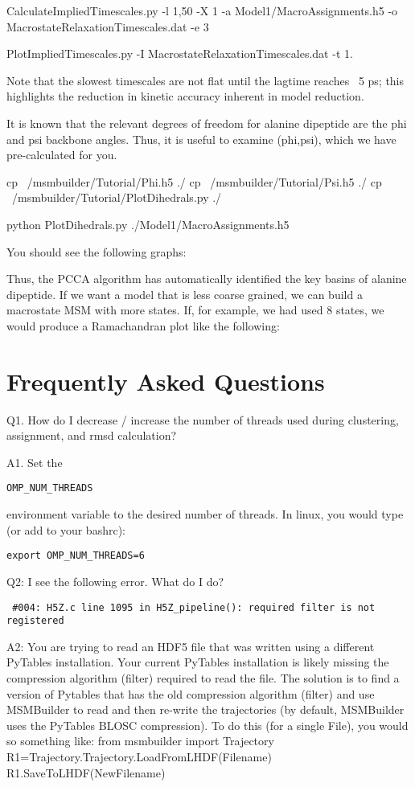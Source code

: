 \documentclass[12pt]{article}
\begin{document}
CalculateImpliedTimescales.py -l 1,50 -X 1 -a Model1/MacroAssignments.h5 -o MacrostateRelaxationTimescales.dat -e 3

PlotImpliedTimescales.py -I MacrostateRelaxationTimescales.dat  -t 1.

Note that the slowest timescales are not flat until the lagtime reaches ~5 ps; this highlights the reduction in kinetic accuracy inherent in model reduction.  

It is known that the relevant degrees of freedom for alanine dipeptide are the phi and psi backbone angles.  Thus, it is useful to examine (phi,psi), which we have pre-calculated for you.

cp ~/msmbuilder/Tutorial/Phi.h5 ./
cp ~/msmbuilder/Tutorial/Psi.h5 ./
cp ~/msmbuilder/Tutorial/PlotDihedrals.py ./

python PlotDihedrals.py ./Model1/MacroAssignments.h5

You should see the following graphs:


Thus, the PCCA algorithm has automatically identified the key basins of alanine dipeptide.  If we want a model that is less coarse grained, we can build a macrostate MSM with more states.  If, for example, we had used 8 states, we would produce a Ramachandran plot like the following:

\newpage

\section{Frequently Asked Questions}

Q1.  How do I decrease / increase the number of threads used during clustering, assignment, and rmsd calculation?

A1.  Set the \begin{verbatim}OMP_NUM_THREADS\end{verbatim} environment variable to the desired number of threads.  In linux, you would type (or add to your bashrc):
\begin{verbatim}
export OMP_NUM_THREADS=6 
\end{verbatim}

\vspace{5mm}

Q2:  I see the following error.  What do I do?
\begin{verbatim}
 #004: H5Z.c line 1095 in H5Z_pipeline(): required filter is not registered
\end{verbatim}

A2:  You are trying to read an HDF5 file that was written using a different PyTables installation.  Your current PyTables installation is likely missing the compression algorithm (filter) required to read the file.  The solution is to find a version of Pytables that has the old compression algorithm (filter) and use MSMBuilder to read and then re-write the trajectories (by default, MSMBuilder uses the PyTables BLOSC compression).  To do this (for a single File), you would so something like:
from msmbuilder import Trajectory
R1=Trajectory.Trajectory.LoadFromLHDF(Filename)
R1.SaveToLHDF(NewFilename)
\end{document}
